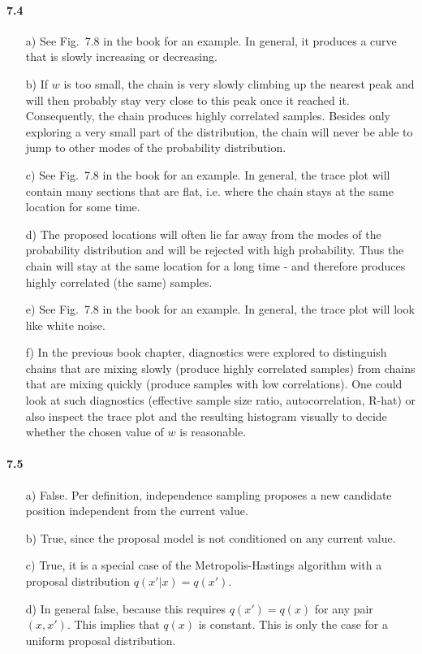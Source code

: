 \documentclass[fontsize=11pt,DIV=18,parskip=half]{scrartcl}
\begin{document}
\paragraph{7.4}
\begin{enumerate}
\item[a)] See Fig.~7.8 in the book for an example. In general, it produces a curve that is slowly increasing or decreasing.
\item[b)] If $w$ is too small, the chain is very slowly climbing up the nearest peak and will then probably stay very close to this peak once it reached it. Consequently, the chain produces highly correlated samples. Besides only exploring a very small part of the distribution, the chain will never be able to jump to other modes of the probability distribution.
\item[c)] See Fig.~7.8 in the book for an example. In general, the trace plot will contain many sections that are flat, i.e. where the chain stays at the same location for some time.
\item[d)] The proposed locations will often lie far away from the modes of the probability distribution and will be rejected with high probability. Thus the chain will stay at the same location for a long time - and therefore produces highly correlated (the same) samples. 
\item[e)] See Fig.~7.8 in the book for an example. In general, the trace plot will look like white noise.
\item[f)] In the previous book chapter, diagnostics were explored to distinguish chains that are mixing slowly (produce highly correlated samples) from chains that are mixing quickly (produce samples with low correlations). One could look at such diagnostics (effective sample size ratio, autocorrelation, R-hat) or also inspect the trace plot and the resulting histogram visually to decide whether the chosen value of $w$ is reasonable.
\end{enumerate}

\paragraph{7.5}

\begin{enumerate}
\item[a)] False. Per definition, independence sampling proposes a new candidate position independent from the current value.
\item[b)] True, since the proposal model is not conditioned on any current value.
\item[c)] True, it is a special case of the Metropolis-Hastings algorithm with a proposal distribution $q(x'|x) = q(x')$.
\item[d)] In general false, because this requires $q(x') = q(x)$ for any pair $(x,x')$. This implies that $q(x)$ is constant. This is only the case for a uniform proposal distribution.
\end{enumerate}
\end{document}
